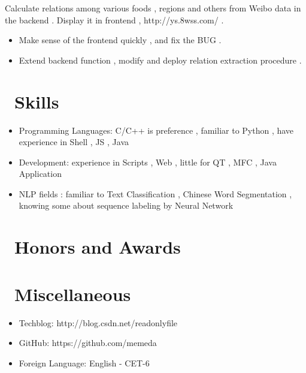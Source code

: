 \documentclass{resume}
\begin{document}
Calculate relations among various foods , regions and others from Weibo data in the backend .
Display it in frontend ,  http://ys.8wss.com/ .
\begin{itemize}
  \item Make sense of the frontend quickly , and fix the BUG .
  \item Extend backend function , modify and deploy relation extraction procedure . 
\end{itemize}



\section{\faCogs\ Skills}
\begin{itemize}[parsep=0.5ex]
  \item Programming Languages: C/C++ is preference , familiar to Python , have experience in Shell , JS , Java
  \item Development: experience in Scripts , Web , little for  QT , MFC , Java Application
  \item NLP fields : familiar to Text Classification , Chinese Word Segmentation , knowing some about sequence labeling by Neural Network 
\end{itemize}

\section{\faHeartO\ Honors and Awards}

\section{\faInfo\ Miscellaneous}
\begin{itemize}[parsep=0.5ex]
  \item Techblog: http://blog.csdn.net/readonlyfile
  \item GitHub: https://github.com/memeda
  \item Foreign Language: English - CET-6
\end{itemize}

%
%
\end{document}
